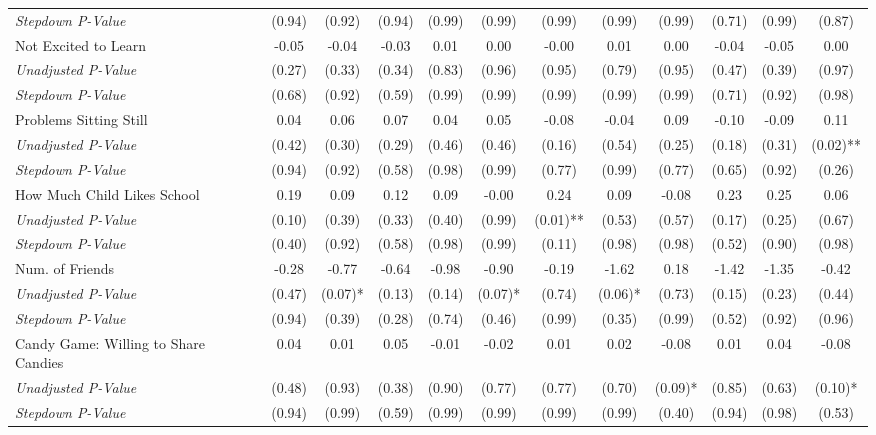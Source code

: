 \begin{tabular}{l c c c c c c c c c c c}
\quad \textit{Stepdown P-Value} & (0.94) & (0.92) & (0.94) & (0.99) & (0.99) & (0.99) & (0.99) & (0.99) & (0.71) & (0.99) & (0.87) \\
Not Excited to Learn & -0.05 & -0.04 & -0.03 & 0.01 & 0.00 & -0.00 & 0.01 & 0.00 & -0.04 & -0.05 & 0.00 \\
\quad \textit{Unadjusted P-Value} & (0.27) & (0.33) & (0.34) & (0.83) & (0.96) & (0.95) & (0.79) & (0.95) & (0.47) & (0.39) & (0.97) \\
\quad \textit{Stepdown P-Value} & (0.68) & (0.92) & (0.59) & (0.99) & (0.99) & (0.99) & (0.99) & (0.99) & (0.71) & (0.92) & (0.98) \\
Problems Sitting Still & 0.04 & 0.06 & 0.07 & 0.04 & 0.05 & -0.08 & -0.04 & 0.09 & -0.10 & -0.09 & 0.11 \\
\quad \textit{Unadjusted P-Value} & (0.42) & (0.30) & (0.29) & (0.46) & (0.46) & (0.16) & (0.54) & (0.25) & (0.18) & (0.31) & (0.02)** \\
\quad \textit{Stepdown P-Value} & (0.94) & (0.92) & (0.58) & (0.98) & (0.99) & (0.77) & (0.99) & (0.77) & (0.65) & (0.92) & (0.26) \\
How Much Child Likes School & 0.19 & 0.09 & 0.12 & 0.09 & -0.00 & 0.24 & 0.09 & -0.08 & 0.23 & 0.25 & 0.06 \\
\quad \textit{Unadjusted P-Value} & (0.10) & (0.39) & (0.33) & (0.40) & (0.99) & (0.01)** & (0.53) & (0.57) & (0.17) & (0.25) & (0.67) \\
\quad \textit{Stepdown P-Value} & (0.40) & (0.92) & (0.58) & (0.98) & (0.99) & (0.11) & (0.98) & (0.98) & (0.52) & (0.90) & (0.98) \\
Num. of Friends & -0.28 & -0.77 & -0.64 & -0.98 & -0.90 & -0.19 & -1.62 & 0.18 & -1.42 & -1.35 & -0.42 \\
\quad \textit{Unadjusted P-Value} & (0.47) & (0.07)* & (0.13) & (0.14) & (0.07)* & (0.74) & (0.06)* & (0.73) & (0.15) & (0.23) & (0.44) \\
\quad \textit{Stepdown P-Value} & (0.94) & (0.39) & (0.28) & (0.74) & (0.46) & (0.99) & (0.35) & (0.99) & (0.52) & (0.92) & (0.96) \\
Candy Game: Willing to Share Candies & 0.04 & 0.01 & 0.05 & -0.01 & -0.02 & 0.01 & 0.02 & -0.08 & 0.01 & 0.04 & -0.08 \\
\quad \textit{Unadjusted P-Value} & (0.48) & (0.93) & (0.38) & (0.90) & (0.77) & (0.77) & (0.70) & (0.09)* & (0.85) & (0.63) & (0.10)* \\
\quad \textit{Stepdown P-Value} & (0.94) & (0.99) & (0.59) & (0.99) & (0.99) & (0.99) & (0.99) & (0.40) & (0.94) & (0.98) & (0.53) \\
\bottomrule
\end{tabular}
